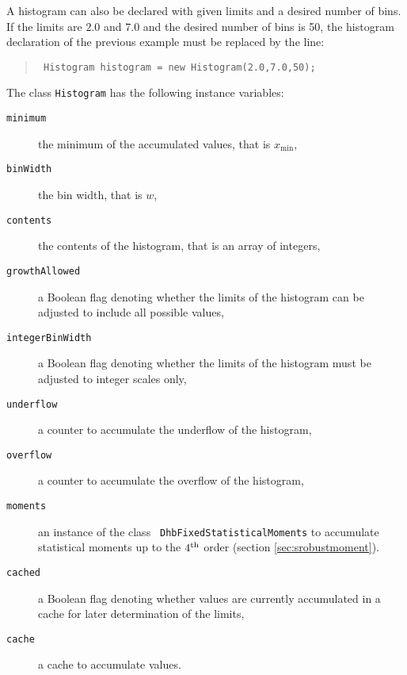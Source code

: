 \documentclass[twoside]{book}
\begin{document}
\noindent A histogram can also be declared with given limits and a
desired number of bins. If the limits are $2.0$ and $7.0$ and the
desired number of bins is 50, the histogram declaration of the
previous example must be replaced by the line:
\begin{quote}
\begin{verbatim}
 Histogram histogram = new Histogram(2.0,7.0,50);
\end{verbatim}
\end{quote}

\noindent The class {\tt Histogram} has the following instance
variables:
\begin{description}
  \item[\tt minimum] the minimum of the accumulated values, that
  is $x_{\min}$,
  \item[\tt binWidth] the bin width, that is $w$,
  \item[\tt contents] the contents of the histogram, that is an
  array of integers,
  \item[\tt growthAllowed] a Boolean flag denoting whether the limits
  of the histogram can be adjusted to include all possible values,
  \item[\tt integerBinWidth] a Boolean flag denoting whether the limits
  of the histogram must be adjusted to integer scales only,
  \item[\tt underflow] a counter to accumulate the underflow of the histogram,
  \item[\tt overflow] a counter to accumulate the overflow of the histogram,
  \item[\tt moments] an instance of the class {\tt
  DhbFixedStatisticalMoments} to accumulate statistical moments up
  to the $4^{\mathop{\rm th}}$ order (\cf section \ref{sec:srobustmoment}).
  \item[\tt cached] a Boolean flag denoting whether values are
  currently accumulated in a cache for later determination of the limits,
  \item[\tt cache] a cache to accumulate values.
\end{description}
\end{document}

